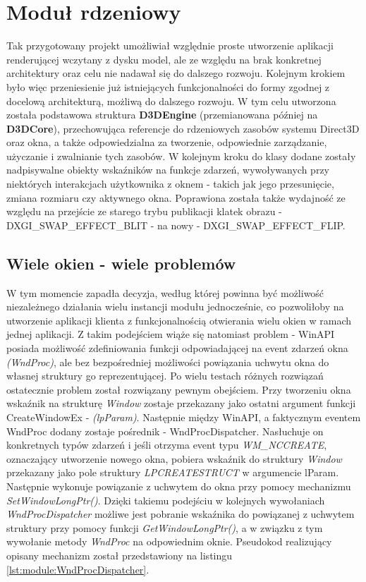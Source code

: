 \vfill
\clearpage

\section{Moduł rdzeniowy}
Tak przygotowany projekt umożliwiał względnie proste utworzenie aplikacji renderującej wczytany z dysku model, ale ze względu na brak konkretnej architektury oraz celu nie nadawał się do dalszego rozwoju. Kolejnym krokiem było więc przeniesienie już istniejących funkcjonalności do formy zgodnej z docelową architekturą, możliwą do dalszego rozwoju. W tym celu utworzona została podstawowa struktura \textbf{D3DEngine} (przemianowana później na \textbf{D3DCore}), przechowująca referencje do rdzeniowych zasobów systemu Direct3D oraz okna, a także odpowiedzialna za tworzenie, odpowiednie zarządzanie, użyczanie i zwalnianie tych zasobów. W kolejnym kroku do klasy dodane zostały nadpisywalne obiekty wskaźników na funkcje zdarzeń, wywoływanych przy niektórych interakcjach użytkownika z oknem - takich jak jego przesunięcie, zmiana rozmiaru czy aktywnego okna. Poprawiona została także wydajność ze względu na przejście ze starego trybu publikacji klatek obrazu - DXGI\_SWAP\_EFFECT\_BLIT - na nowy - DXGI\_SWAP\_EFFECT\_FLIP. 

\subsection{Wiele okien - wiele problemów}
W tym momencie zapadła decyzja, według której powinna być możliwość niezależnego działania wielu instancji modułu jednocześnie, co pozwoliłoby na utworzenie aplikacji klienta z funkcjonalnością otwierania wielu okien w ramach jednej aplikacji. Z takim podejściem wiąże się natomiast problem - WinAPI posiada możliwość zdefiniowania funkcji odpowiadającej na event zdarzeń okna \textit{(WndProc)}, ale bez bezpośredniej możliwości powiązania uchwytu okna do własnej struktury go reprezentującej. Po wielu testach różnych rozwiązań ostatecznie problem został rozwiązany pewnym obejściem. Przy tworzeniu okna wskaźnik na strukturę \textit{Window} zostaje przekazany jako ostatni argument funkcji CreateWindowEx - \textit{(lpParam)}. Następnie między WinAPI, a faktycznym eventem WndProc dodany zostaje pośrednik - WndProcDispatcher. Nasłuchuje on konkretnych typów zdarzeń i jeśli otrzyma event typu \textit{WM\_NCCREATE}, oznaczający utworzenie nowego okna, pobiera wskaźnik do struktury \textit{Window} przekazany jako pole struktury \textit{LPCREATESTRUCT} w argumencie lParam. Następnie wykonuje powiązanie z uchwytem do okna przy pomocy mechanizmu \textit{SetWindowLongPtr()}. Dzięki takiemu podejściu w kolejnych wywołaniach \textit{WndProcDispatcher} możliwe jest pobranie wskaźnika do powiązanej z uchwytem struktury przy pomocy funkcji \textit{GetWindowLongPtr()}, a w związku z tym wywołanie metody \textit{WndProc} na odpowiednim oknie. Pseudokod realizujący opisany mechanizm został przedstawiony na listingu \ref{lst:module:WndProcDispatcher}.

